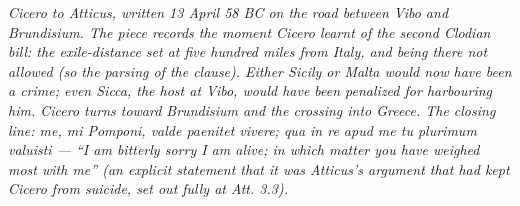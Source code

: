 
\textit{Cicero to Atticus, written 13 April 58 BC on the
road between Vibo and Brundisium. The piece records the
moment Cicero learnt of the second Clodian bill: the
exile-distance set at five hundred miles from Italy, and
\textit{being there not allowed} (so the parsing of the
clause). Either Sicily or Malta would now have been a
crime; even Sicca, the host at Vibo, would have been
penalized for harbouring him. Cicero turns toward Brundisium
and the crossing into Greece. The closing line: \textit{me,
mi Pomponi, valde paenitet vivere; qua in re apud me tu
plurimum valuisti} --- ``I am bitterly sorry I am alive; in
which matter you have weighed most with me'' (an explicit
statement that it was Atticus's argument that had kept
Cicero from suicide, set out fully at \textit{Att.} 3.3).}

